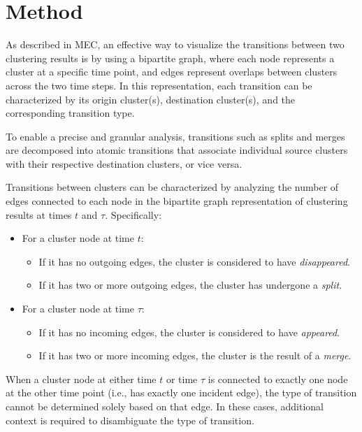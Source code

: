\chapter{Method}\label{ch:method}

As described in MEC, an effective way to visualize the transitions between two
clustering results is by using a bipartite graph, where each node represents a
cluster at a specific time point, and edges represent overlaps between clusters
across the two time steps. In this representation, each transition can be
characterized by its origin cluster(s), destination cluster(s), and the
corresponding transition type.



To enable a precise and granular analysis, transitions such as splits and
merges are decomposed into atomic transitions that associate individual source
clusters with their respective destination clusters, or vice versa.



Transitions between clusters can be characterized by analyzing the number of
edges connected to each node in the bipartite graph representation of
clustering results at times $ t $ and $ \tau $. Specifically:

\begin{itemize}
    \item For a cluster node at time $ t $:
          \begin{itemize}
              \item If it has no outgoing edges, the cluster is considered to have
                    \emph{disappeared}.
              \item If it has two or more outgoing edges, the cluster has undergone a \emph{split}.
          \end{itemize}
    \item For a cluster node at time $ \tau $:
          \begin{itemize}
              \item If it has no incoming edges, the cluster is considered to have \emph{appeared}.
              \item If it has two or more incoming edges, the cluster is the result of a
                    \emph{merge}.
          \end{itemize}
\end{itemize}

When a cluster node at either time $ t $ or time $ \tau $ is connected to
exactly one node at the other time point (i.e., has exactly one incident edge),
the type of transition cannot be determined solely based on that edge. In these
cases, additional context is required to disambiguate the type of transition.

